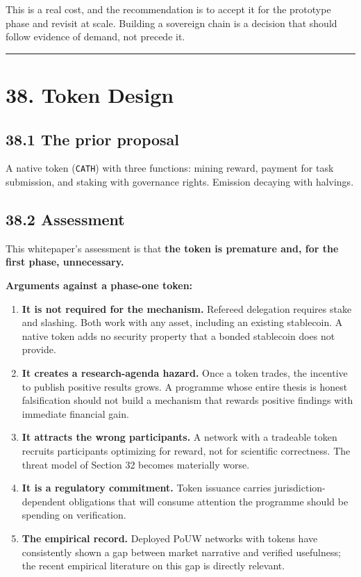 \documentclass[
  11pt]{report}
\providecommand{\tightlist}{%
  \setlength{\itemsep}{0pt}\setlength{\parskip}{0pt}}
\begin{document}
This is a real cost, and the recommendation is to accept it for the
prototype phase and revisit at scale. Building a sovereign chain is a
decision that should follow evidence of demand, not precede it.

\begin{center}\rule{0.5\linewidth}{0.5pt}\end{center}

\hypertarget{token-design}{%
\chapter{38. Token Design}\label{token-design}}

\hypertarget{the-prior-proposal}{%
\section{38.1 The prior proposal}\label{the-prior-proposal}}

A native token (\texttt{CATH}) with three functions: mining reward,
payment for task submission, and staking with governance rights.
Emission decaying with halvings.

\hypertarget{assessment}{%
\section{38.2 Assessment}\label{assessment}}

This whitepaper's assessment is that \textbf{the token is premature and,
for the first phase, unnecessary.}

\textbf{Arguments against a phase-one token:}

\begin{enumerate}
\def\labelenumi{\arabic{enumi}.}
\tightlist
\item
  \textbf{It is not required for the mechanism.} Refereed delegation
  requires stake and slashing. Both work with any asset, including an
  existing stablecoin. A native token adds no security property that a
  bonded stablecoin does not provide.
\item
  \textbf{It creates a research-agenda hazard.} Once a token trades, the
  incentive to publish positive results grows. A programme whose entire
  thesis is honest falsification should not build a mechanism that
  rewards positive findings with immediate financial gain.
\item
  \textbf{It attracts the wrong participants.} A network with a
  tradeable token recruits participants optimizing for reward, not for
  scientific correctness. The threat model of Section 32 becomes
  materially worse.
\item
  \textbf{It is a regulatory commitment.} Token issuance carries
  jurisdiction-dependent obligations that will consume attention the
  programme should be spending on verification.
\item
  \textbf{The empirical record.} Deployed PoUW networks with tokens have
  consistently shown a gap between market narrative and verified
  usefulness; the recent empirical literature on this gap is directly
  relevant.
\end{enumerate}
\end{document}
